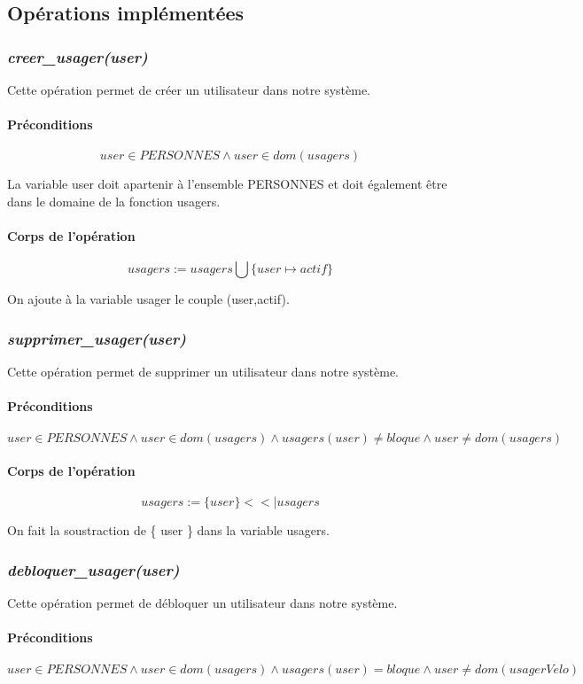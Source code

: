 \documentclass[12pt]{article}
\begin{document}
\subsection{Opérations implémentées}
\subsubsection{\textit{creer\_usager(user)}}
Cette opération permet de créer un utilisateur dans notre système.
\paragraph{Préconditions}
\[user \in PERSONNES \land user \in dom(usagers)\]

La variable user doit apartenir à l'ensemble PERSONNES et doit également être dans le domaine de la fonction usagers.
\paragraph{Corps de l'opération}
\[ usagers := usagers \bigcup \{user \mapsto actif\} \]

On ajoute à la variable usager le couple (user,actif).
\subsubsection{\textit{supprimer\_usager(user)}}
Cette opération permet de supprimer un utilisateur dans notre système.
\paragraph{Préconditions}
\[user \in PERSONNES \land user \in dom(usagers) \land usagers(user) \neq bloque \land user \neq dom(usagers) \]

\paragraph{Corps de l'opération}
\[ usagers := \{ user \} <<| usagers \]

On fait la soustraction de \{ user \} dans la variable usagers.

\subsubsection{\textit{debloquer\_usager(user)}}
Cette opération permet de débloquer un utilisateur dans notre système.
\paragraph{Préconditions}
\[ user \in PERSONNES \land user \in dom(usagers) \land usagers(user) = bloque \land user \neq dom(usagerVelo) \]
\end{document}
